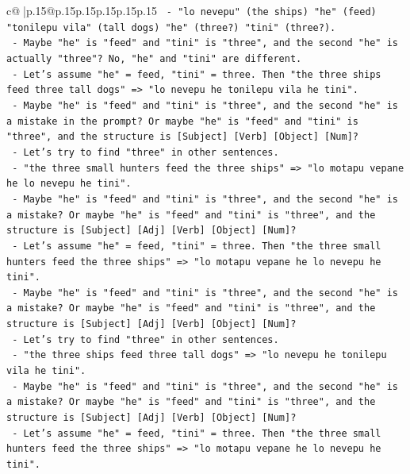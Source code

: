 \documentclass{article}
\begin{document}
{\begin{supertabular}{c@{$\;$}|p{.15\linewidth}@{}p{.15\linewidth}p{.15\linewidth}p{.15\linewidth}p{.15\linewidth}p{.15\linewidth}}
{{{\texttt{             {-} "lo nevepu" (the ships) "he" (feed) "tonilepu vila" (tall dogs) "he" (three?) "tini" (three?).} \\
\texttt{             {-} Maybe "he" is "feed" and "tini" is "three", and the second "he" is actually "three"? No, "he" and "tini" are different.} \\
\texttt{             {-} Let's assume "he" = feed, "tini" = three. Then "the three ships feed three tall dogs" => "lo nevepu he tonilepu vila he tini".} \\
\texttt{             {-} Maybe "he" is "feed" and "tini" is "three", and the second "he" is a mistake in the prompt? Or maybe "he" is "feed" and "tini" is "three", and the structure is {[}Subject{]} {[}Verb{]} {[}Object{]} {[}Num{]}?} \\
\texttt{             {-} Let's try to find "three" in other sentences.} \\
\texttt{             {-} "the three small hunters feed the three ships" => "lo motapu vepane he lo nevepu he tini".} \\
\texttt{             {-} Maybe "he" is "feed" and "tini" is "three", and the second "he" is a mistake? Or maybe "he" is "feed" and "tini" is "three", and the structure is {[}Subject{]} {[}Adj{]} {[}Verb{]} {[}Object{]} {[}Num{]}?} \\
\texttt{             {-} Let's assume "he" = feed, "tini" = three. Then "the three small hunters feed the three ships" => "lo motapu vepane he lo nevepu he tini".} \\
\texttt{             {-} Maybe "he" is "feed" and "tini" is "three", and the second "he" is a mistake? Or maybe "he" is "feed" and "tini" is "three", and the structure is {[}Subject{]} {[}Adj{]} {[}Verb{]} {[}Object{]} {[}Num{]}?} \\
\texttt{             {-} Let's try to find "three" in other sentences.} \\
\texttt{             {-} "the three ships feed three tall dogs" => "lo nevepu he tonilepu vila he tini".} \\
\texttt{             {-} Maybe "he" is "feed" and "tini" is "three", and the second "he" is a mistake? Or maybe "he" is "feed" and "tini" is "three", and the structure is {[}Subject{]} {[}Adj{]} {[}Verb{]} {[}Object{]} {[}Num{]}?} \\
\texttt{             {-} Let's assume "he" = feed, "tini" = three. Then "the three small hunters feed the three ships" => "lo motapu vepane he lo nevepu he tini".} \\
}}}
\end{supertabular}}
\end{document}
